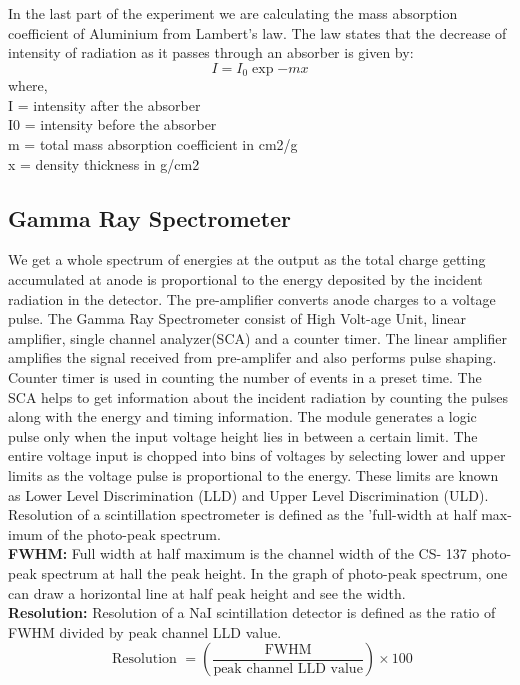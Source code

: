 \documentclass[%
 reprint,
nofootinbib,
 amsmath,amssymb,
 aps,
floatfix,
]{revtex4-2}
\begin{document}
 In the last part of the experiment we are calculating the mass absorption coefficient of Aluminium from Lambert’s law. The law states that the decrease of intensity of radiation as it passes through an absorber is given by:
 \begin{equation}
     I = I_0 \exp{-mx}
 \end{equation}
where, \\
I = intensity after the absorber\\
I0 = intensity before the absorber\\
m = total mass absorption coefficient in cm2/g\\
x = density thickness in g/cm2\\

\subsection{Gamma Ray Spectrometer}
We get a whole spectrum of energies at the output as the total charge getting accumulated at
anode is proportional to the energy deposited by the
incident radiation in the detector. The pre-amplifier converts anode charges to a voltage pulse. The Gamma Ray Spectrometer consist of High Volt-age Unit, linear amplifier, single channel analyzer(SCA) and a counter timer. The linear amplifier amplifies
the signal received from pre-amplifer and also performs
pulse shaping. Counter timer is used in counting the
number of events in a preset time. The SCA helps to get information about the incident radiation by counting the pulses along with the energy and timing information. The module generates a logic pulse only when the input voltage
height lies in between a certain limit. The entire voltage input is chopped into bins of voltages by selecting lower and upper limits as the voltage pulse is proportional to the energy. These limits are known as Lower Level Discrimination (LLD) and
Upper Level Discrimination (ULD). Resolution of a scintillation spectrometer is defined as the ’full-width at half max-
imum of the photo-peak spectrum.\\ 

\textbf{FWHM:} Full width at half maximum is the channel width of the CS- 137 photo-peak spectrum at hall the peak height. In the graph of photo-peak spectrum, one can draw a horizontal line at half peak height and see the width. \\

\textbf{Resolution:} Resolution of a NaI scintillation detector is defined as the ratio of FWHM divided by peak channel LLD value.
$$
\text { Resolution }=\left(\dfrac{\text{FWHM}}{\text{peak channel LLD value}}\right) \times 100
$$
\end{document}
